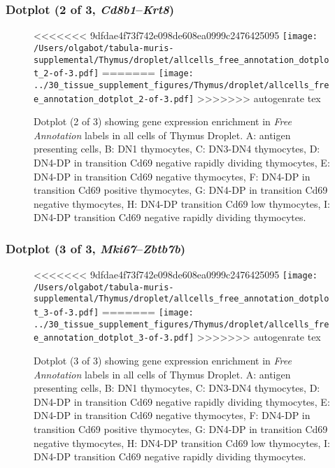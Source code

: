 \clearpage

\subsubsection{Dotplot (2 of 3, \emph{Cd8b1}--\emph{Krt8})}
\begin{figure}[h]
\centering
<<<<<<< 9dfdae4f73f742e098de608ea0999c2476425095
\texttt{[image: /Users/olgabot/tabula-muris-supplemental/Thymus/droplet/allcells\_free\_annotation\_dotplot\_2-of-3.pdf]}
=======
\texttt{[image: ../30\_tissue\_supplement\_figures/Thymus/droplet/allcells\_free\_annotation\_dotplot\_2-of-3.pdf]}
>>>>>>> autogenrate tex

\caption{ Dotplot (2 of 3)  showing gene expression enrichment in \emph{Free Annotation} labels in all cells of Thymus Droplet. A: antigen presenting cells, B: DN1 thymocytes, C: DN3-DN4 thymocytes, D: DN4-DP in transition Cd69 negative rapidly dividing thymocytes, E: DN4-DP in transition Cd69 negative thymocytes, F: DN4-DP in transition Cd69 positive thymocytes, G: DN4-DP in transition Cd69 negative thymocytes, H: DN4-DP transition Cd69 low thymocytes, I: DN4-DP transition Cd69 negative rapidly dividing thymocytes.}
\end{figure}


\clearpage

\subsubsection{Dotplot (3 of 3, \emph{Mki67}--\emph{Zbtb7b})}
\begin{figure}[h]
\centering
<<<<<<< 9dfdae4f73f742e098de608ea0999c2476425095
\texttt{[image: /Users/olgabot/tabula-muris-supplemental/Thymus/droplet/allcells\_free\_annotation\_dotplot\_3-of-3.pdf]}
=======
\texttt{[image: ../30\_tissue\_supplement\_figures/Thymus/droplet/allcells\_free\_annotation\_dotplot\_3-of-3.pdf]}
>>>>>>> autogenrate tex

\caption{ Dotplot (3 of 3)  showing gene expression enrichment in \emph{Free Annotation} labels in all cells of Thymus Droplet. A: antigen presenting cells, B: DN1 thymocytes, C: DN3-DN4 thymocytes, D: DN4-DP in transition Cd69 negative rapidly dividing thymocytes, E: DN4-DP in transition Cd69 negative thymocytes, F: DN4-DP in transition Cd69 positive thymocytes, G: DN4-DP in transition Cd69 negative thymocytes, H: DN4-DP transition Cd69 low thymocytes, I: DN4-DP transition Cd69 negative rapidly dividing thymocytes.}
\end{figure}


